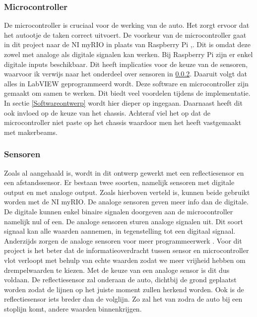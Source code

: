 \documentclass[a4paper,twoside,kulak]{kulakreport} %
\begin{document}
\subsubsection{Microcontroller}
De microcontroller is cruciaal voor de werking van de auto. Het zorgt ervoor dat het autootje de taken correct uitvoert. De voorkeur van de microcontroller gaat in dit project naar de NI myRIO in plaats van Raspberry Pi \cite{nimyrio},\cite{RaspberryPi}.
Dit is omdat deze zowel met analoge als digitale signalen kan werken. 
Bij Raspberry Pi zijn er enkel digitale inputs beschikbaar. Dit heeft implicaties voor de keuze van de sensoren, waarvoor ik verwijs naar het onderdeel over sensoren in \ref{Sensoren}.
Daaruit volgt dat alles in LabVIEW geprogrammeerd wordt.
Deze software en microcontroller zijn gemaakt om samen te werken. Dit biedt veel voordelen tijdens de implementatie. In sectie \ref{Softwareontwerp} wordt hier dieper op ingegaan. %
Daarnaast heeft dit ook invloed op de keuze van het chassis. Achteraf viel het op dat de microcontroller niet paste op het chassis waardoor men het heeft vastgemaakt met makerbeams.

\label{Microcontroller}

\subsubsection{Sensoren} \label{Sensoren}
Zoals al aangehaald is, wordt in dit ontwerp gewerkt met een reflectiesensor en een afstandssensor. Er bestaan twee soorten, namelijk sensoren met digitale output en met analoge output. Zoals hierboven verteld is, kunnen beide gebruikt worden met de NI myRIO. De analoge sensoren geven meer info dan de digitale. De digitale kunnen enkel binaire signalen doorgeven aan de microcontroller namelijk nul of een. De analoge sensoren sturen analoge signalen uit. Dit soort signaal kan alle waarden aannemen, in tegenstelling tot een digitaal signaal. Anderzijds zorgen de analoge sensoren voor meer programmeerwerk \cite{DigitaalOfAnaloog}. Voor dit project is het beter dat de informatieoverdracht tussen sensor en microcontroller vlot verloopt met behulp van echte waarden zodat we meer vrijheid hebben om drempelwaarden te kiezen. Met de keuze van een analoge sensor is dit dus voldaan. %
De reflectiesensor zal onderaan de auto, dichtbij de grond geplaatst worden zodat de lijnen op het juiste moment zullen herkend worden. Ook is de reflectiesensor iets breder dan de volglijn. Zo zal het van zodra de auto bij een stoplijn komt, andere waarden binnenkrijgen.
\end{document}
